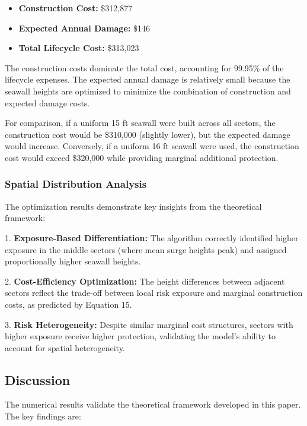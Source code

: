 \documentclass{article}
\begin{document}
\begin{itemize}
\item \textbf{Construction Cost:} \$312,877
\item \textbf{Expected Annual Damage:} \$146
\item \textbf{Total Lifecycle Cost:} \$313,023
\end{itemize}

The construction costs dominate the total cost, accounting for 99.95\% of the lifecycle expenses. The expected annual damage is relatively small because the seawall heights are optimized to minimize the combination of construction and expected damage costs.

For comparison, if a uniform 15 ft seawall were built across all sectors, the construction cost would be \$310,000 (slightly lower), but the expected damage would increase. Conversely, if a uniform 16 ft seawall were used, the construction cost would exceed \$320,000 while providing marginal additional protection.

\subsubsection{Spatial Distribution Analysis}
The optimization results demonstrate key insights from the theoretical framework:

1. \textbf{Exposure-Based Differentiation:} The algorithm correctly identified higher exposure in the middle sectors (where mean surge heights peak) and assigned proportionally higher seawall heights.

2. \textbf{Cost-Efficiency Optimization:} The height differences between adjacent sectors reflect the trade-off between local risk exposure and marginal construction costs, as predicted by Equation 15.

3. \textbf{Risk Heterogeneity:} Despite similar marginal cost structures, sectors with higher exposure receive higher protection, validating the model's ability to account for spatial heterogeneity.

\subsection{Discussion}

The numerical results validate the theoretical framework developed in this paper. The key findings are:
\end{document}
